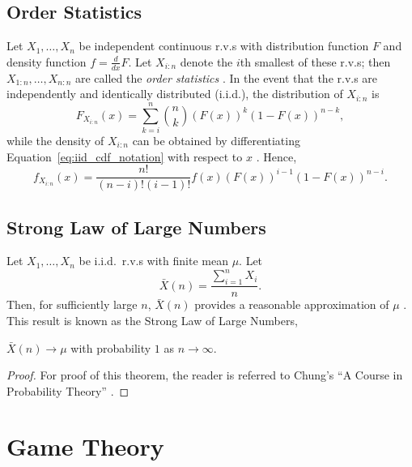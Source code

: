 \subsection{Order Statistics} %
\label{sub:order_statistics_notation}
Let $X_1, \ldots, X_n$ be independent continuous r.v.s with distribution function $F$ and density function $f= \frac{d}{dx}F$. Let $X_{i:n}$ denote the $i$th smallest of these r.v.s; then $X_{1:n}, \ldots,X_{n:n}$ are called the \emph{order statistics} \cite{Arnold08,David03}. In the event that the r.v.s are independently and identically distributed (i.i.d.), the distribution of $X_{i:n}$ is
\begin{equation}
	\label{eq:iid_cdf_notation}
	F_{X_{i:n}}(x) = \sum_{k=i}^{n} \binom{n}{k} (F(x))^k (1-F(x))^{n-k},
\end{equation}
while the density of $X_{i:n}$ can be obtained by differentiating Equation~\eqref{eq:iid_cdf_notation} with respect to $x$ \cite{Ross10}. Hence,
\begin{equation}
	\label{eq:iid_pdf_notation}
	f_{X_{i:n}}(x) = \frac{n!}{(n-i)!(i-1)!} f(x) (F(x))^{i-1} (1-F(x))^{n-i}.
\end{equation}

\subsection{Strong Law of Large Numbers} %
\label{sub:strong_law_of_large_numbers_notation}
Let $X_1,\ldots,X_n$ be i.i.d.~r.v.s with finite mean $\mu$. Let
\begin{equation}
  \bar{X}(n) = \frac{\sum_{i=1}^n X_i}{n}.
\end{equation}
Then, for sufficiently large $n$, $\bar{X}(n)$ provides a reasonable approximation of $\mu$ \cite{LawChapter42007}. This result is known as the Strong Law of Large Numbers,
\begin{thm}
$\bar{X}(n)\rightarrow\mu$ with probability $1$ as $n\rightarrow\infty$.
\end{thm}
\begin{proof}
For proof of this theorem, the reader is referred to Chung's ``A Course in Probability Theory'' \cite{Chung2001}.
\end{proof}

\section{Game Theory} %
\label{sec:theory_of_games_notation}

